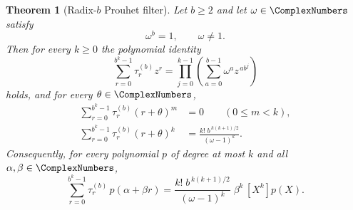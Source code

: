 \documentclass[11pt,a4paper,oneside,openany]{book}
\newtheorem{theorem}{Theorem}[chapter]
\theoremstyle{definition}
\theoremstyle{remark}
\begin{document}
\begin{theorem}[Radix-$b$ Prouhet filter]\label{thm:radix-b-prouhet}
Let $b\ge2$ and let $\omega\in\ComplexNumbers$ satisfy
\begin{equation}\label{eq:radix-b-omega}
 \omega^b=1,\qquad\omega\ne1 .
\end{equation}
Then for every $k\ge0$ the polynomial identity
\begin{equation}\label{eq:radix-b-product}
 \sum_{r=0}^{b^k-1}\tau^{(b)}_r z^r
 =\prod_{j=0}^{k-1}
   \left(\sum_{a=0}^{b-1}\omega^az^{\,ab^j}\right)
\end{equation}
holds, and for every $\theta\in\ComplexNumbers$,
\begin{align}
 \sum_{r=0}^{b^k-1}\tau^{(b)}_r(r+\theta)^m&=0
 \qquad(0\le m<k),\label{eq:radix-b-lower}\\
 \sum_{r=0}^{b^k-1}\tau^{(b)}_r(r+\theta)^k
 &=\frac{k!\;b^{\,k(k+1)/2}}{(\omega-1)^k}.\label{eq:radix-b-top}
\end{align}
Consequently, for every polynomial $p$ of degree at most $k$ and all $\alpha,\beta\in\ComplexNumbers$,
\begin{equation}\label{eq:radix-b-functional}
 \sum_{r=0}^{b^k-1}\tau^{(b)}_r\,p(\alpha+\beta r)
 =\frac{k!\;b^{\,k(k+1)/2}}{(\omega-1)^k}\;\beta^k\,[X^k]p(X).
\end{equation}
\end{theorem}
\end{document}
